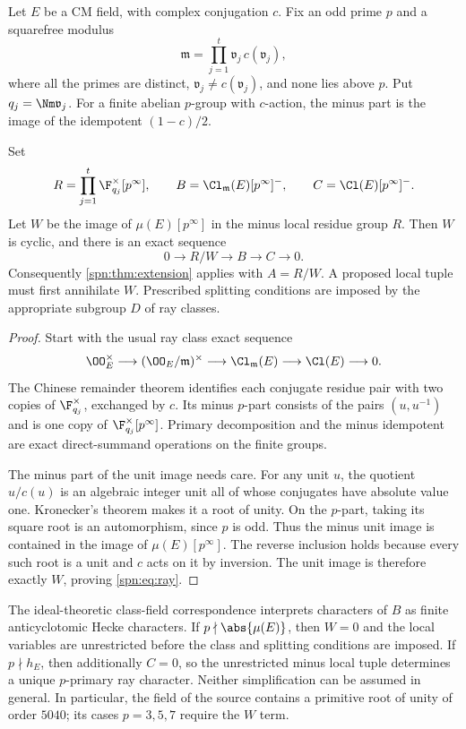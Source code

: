 Let $E$ be a CM field, with complex conjugation $c$. Fix an odd prime $p$ and
a squarefree modulus
\[
 \mathfrak m=\prod_{j=1}^t\mathfrak v_j\,c(\mathfrak v_j),
\]
where all the primes are distinct, $\mathfrak v_j\ne c(\mathfrak v_j)$, and
none lies above $p$. Put $q_j=\Nm\mathfrak v_j$. For a finite abelian
$p$-group with $c$-action, the minus part is the image of the idempotent
$(1-c)/2$.

\begin{theorem}\label{spn:thm:ray}
Set
\[
 R=\prod_{j=1}^t\F_{q_j}^{\times}[p^\infty],\qquad
 B=\Cl_{\mathfrak m}(E)[p^\infty]^{-},\qquad C=\Cl(E)[p^\infty]^{-}.
\]
Let $W$ be the image of $\mu(E)[p^\infty]$ in the minus local residue group
$R$. Then $W$ is cyclic, and there is an exact sequence
\begin{equation}\label{spn:eq:ray}
 0\longrightarrow R/W\longrightarrow B\longrightarrow C\longrightarrow0 .
\end{equation}
Consequently \cref{spn:thm:extension} applies with $A=R/W$. A proposed local
tuple must first annihilate $W$. Prescribed splitting conditions are imposed
by the appropriate subgroup $D$ of ray classes.
\end{theorem}

\begin{proof}
Start with the usual ray class exact sequence
\[
 \OO_E^\times\longrightarrow(\OO_E/\mathfrak m)^\times\longrightarrow
 \Cl_{\mathfrak m}(E)\longrightarrow\Cl(E)\longrightarrow0 .
\]
The Chinese remainder theorem identifies each conjugate residue pair with two
copies of $\F_{q_j}^\times$, exchanged by $c$. Its minus $p$-part consists of
the pairs $(u,u^{-1})$ and is one copy of $\F_{q_j}^\times[p^\infty]$.
Primary decomposition and the minus idempotent are exact direct-summand
operations on the finite groups.

The minus part of the unit image needs care. For any unit $u$, the quotient
$u/c(u)$ is an algebraic integer unit all of whose conjugates have absolute
value one. Kronecker's theorem makes it a root of unity. On the $p$-part,
taking its square root is an automorphism, since $p$ is odd. Thus the minus
unit image is contained in the image of $\mu(E)[p^\infty]$. The reverse
inclusion holds because every such root is a unit and $c$ acts on it by
inversion. The unit image is therefore exactly $W$, proving
\eqref{spn:eq:ray}.
\end{proof}

The ideal-theoretic class-field correspondence \cite{Milne2020CFT} interprets
characters of $B$ as finite anticyclotomic Hecke characters. If
$p\nmid\abs{\mu(E)}$, then $W=0$ and the local variables are unrestricted
before the class and splitting conditions are imposed. If $p\nmid h_E$, then
additionally $C=0$, so the unrestricted minus local tuple determines a unique
$p$-primary ray character. Neither simplification can be assumed in general.
In particular, the field of the source contains a primitive root of unity of
order $5040$; its cases $p=3,5,7$ require the $W$ term.

